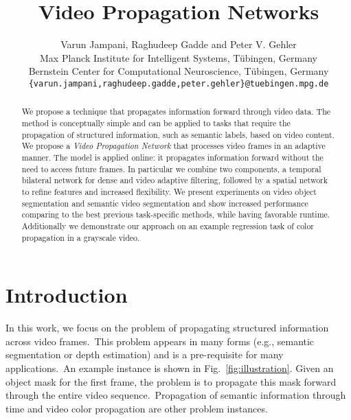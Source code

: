 \documentclass[10pt,twocolumn,letterpaper]{article}
\begin{document}
\title{Video Propagation Networks}

\author{
Varun Jampani, Raghudeep Gadde and Peter V. Gehler\\
Max Planck Institute for Intelligent Systems, T{\"u}bingen, Germany\\
Bernstein Center for Computational Neuroscience, T{\"u}bingen, Germany \\
\texttt{\{varun.jampani,raghudeep.gadde,peter.gehler\}@tuebingen.mpg.de} \\
}

\maketitle


\begin{abstract}
We propose a technique that propagates information forward
  through video data. The method is conceptually simple and can be applied to tasks that
  require the propagation of structured information, such as semantic labels,
  based on video content.
We propose a \emph{Video Propagation Network} that processes video frames in an
  adaptive manner. The model is applied online: it propagates information
  forward without the need to access future frames.
  In particular we combine two components, a temporal bilateral network
  for dense and video adaptive filtering, followed by a spatial network to refine
  features and increased flexibility.
We present experiments on video object segmentation and semantic video segmentation
  and show increased performance comparing to the best previous
  task-specific methods, while having favorable runtime.
  Additionally we demonstrate our approach on an example
  regression task of color propagation in a grayscale video.

\end{abstract}

\vspace{-0.35cm}
\section{Introduction}

In this work, we focus on the problem of propagating structured information across video frames.~This
problem appears in many forms (e.g., semantic segmentation or depth estimation) and is a pre-requisite for many applications.~An example instance is shown in Fig.~\ref{fig:illustration}.
Given an object mask for the first frame, the problem is to propagate this mask forward
through the entire video sequence.~Propagation of semantic information through time and video
color propagation are other problem instances.
\end{document}

